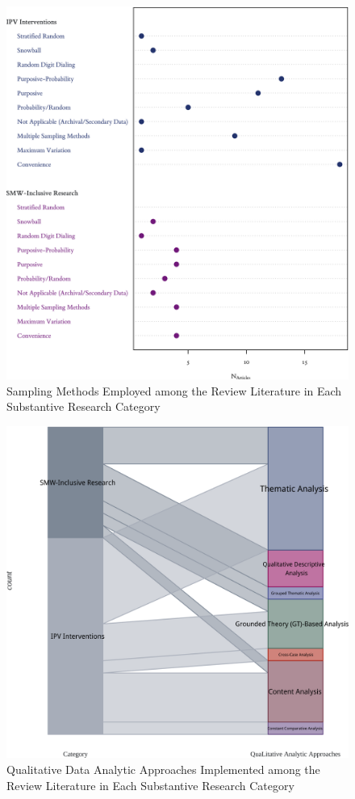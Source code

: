 \documentclass[11pt,]{tufte-book}
\begin{document}
\begin{figure}
\centering
\includegraphics{graphics/inputs/sampling.png}
\caption{Sampling Methods Employed among the Review Literature in Each
Substantive Research Category\label{fig:sampling}}
\end{figure}

\newpage

\begin{figure}
\centering
\includegraphics{graphics/inputs/aql.png}
\caption{Qualitative Data Analytic Approaches Implemented among the
Review Literature in Each Substantive Research Category\label{fig:aql}}
\end{figure}
\end{document}

